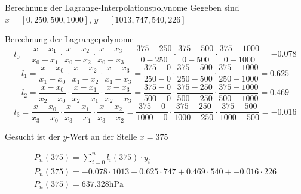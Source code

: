 \begin{example2}{Berechnung der Lagrange-Interpolationspolynome}
    Gegeben sind
    $x=[0,250,500,1000]$, $y=[1013,747,540,226]$

    Berechnung der Lagrangepolynome
    $$l_0=\frac{x-x_1}{x_0-x_1} \cdot \frac{x-x_2}{x_0-x_2} \cdot \frac{x-x_3}{x_0-x_3}=\frac{375-250}{0-250} \cdot \frac{375-500}{0-500} \cdot \frac{375-1000}{0-1000}=-0.078$$
    $$l_1=\frac{x-x_0}{x_1-x_0} \cdot \frac{x-x_2}{x_1-x_2} \cdot \frac{x-x_3}{x_1-x_3}=\frac{375-0}{250-0} \cdot \frac{375-500}{250-500} \cdot \frac{375-1000}{250-1000}=0.625$$
    $$l_2=\frac{x-x_0}{x_2-x_0} \cdot \frac{x-x_1}{x_2-x_1} \cdot \frac{x-x_3}{x_2-x_3}=\frac{375-0}{500-0} \cdot \frac{375-250}{500-250} \cdot \frac{375-1000}{500-1000}=0.469$$
    $$l_3=\frac{x-x_0}{x_3-x_0} \cdot \frac{x-x_1}{x_3-x_1} \cdot \frac{x-x_2}{x_3-x_2}=\frac{375-0}{1000-0} \cdot \frac{375-250}{1000-250} \cdot \frac{375-500}{1000-500}=-0.016$$

    Gesucht ist der $y$-Wert an der Stelle $x=375$

    $$
    \begin{gathered}
    P_n(375)=\sum_{i=0}^n l_i(375) \cdot y_i \\
    P_n(375)=-0.078 \cdot 1013+0.625 \cdot 747+0.469 \cdot 540+-0.016 \cdot 226 \\
    P_n(375)=637.328 \mathrm{hPa}
    \end{gathered}
    $$
  
\end{example2}